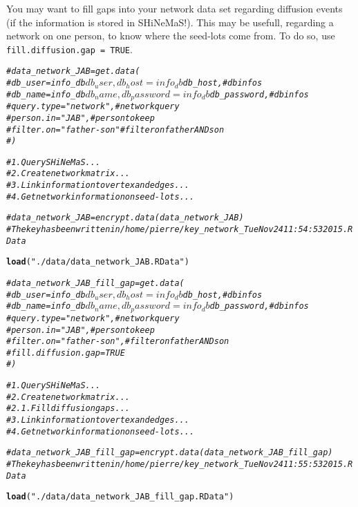 \documentclass{article}\usepackage[]{graphicx}\usepackage[]{color}
\makeatletter
\newcommand{\hlstr}[1]{\textcolor[rgb]{0.192,0.494,0.8}{#1}}%
\newcommand{\hlcom}[1]{\textcolor[rgb]{0.678,0.584,0.686}{\textit{#1}}}%
\newcommand{\hlstd}[1]{\textcolor[rgb]{0.345,0.345,0.345}{#1}}%
\newcommand{\hlkwd}[1]{\textcolor[rgb]{0.737,0.353,0.396}{\textbf{#1}}}%
\newenvironment{kframe}{%
 \def\at@end@of@kframe{}%
 \ifinner\ifhmode%
  \def\at@end@of@kframe{\end{minipage}}%
  \begin{minipage}{\columnwidth}%
 \fi\fi%
 \def\FrameCommand##1{\hskip\@totalleftmargin \hskip-\fboxsep
 \colorbox{shadecolor}{##1}\hskip-\fboxsep
     \hskip-\linewidth \hskip-\@totalleftmargin \hskip\columnwidth}%
 \MakeFramed {\advance\hsize-\width
   \@totalleftmargin\z@ \linewidth\hsize
   \@setminipage}}%
 {\par\unskip\endMakeFramed%
 \at@end@of@kframe}
\newenvironment{knitrout}{}{} %
\newcommand{\BD}{SHiNeMaS}
\makeatother
\begin{document}
You may want to fill gaps into your network data set regarding diffusion events (if the information is stored in \BD!).
This may be usefull, regarding a network on one person, to know where the seed-lots come from.
To do so, use \texttt{fill.diffusion.gap = TRUE}.

\begin{knitrout}
\color{fgcolor}\begin{kframe}
\begin{alltt}
\hlcom{#data_network_JAB = get.data(}
\hlcom{#	db_user = info_db$db_user, db_host = info_db$db_host, # db infos}
\hlcom{#	db_name = info_db$db_name, db_password = info_db$db_password,  # db infos}
\hlcom{#	query.type = "network", # network query}
\hlcom{#	person.in = "JAB", # person to keep}
\hlcom{#	filter.on = "father-son" # filter on father AND son}
\hlcom{#	)}

\hlcom{# 1. Query SHiNeMaS ...}
\hlcom{# 2. Create network matrix ...}
\hlcom{# 3. Link information to vertex and edges ...}
\hlcom{# 4. Get network information on seed-lots ...}

\hlcom{#data_network_JAB = encrypt.data(data_network_JAB)}
\hlcom{# The key has been written in /home/pierre/key_network_Tue Nov 24 11:54:53 2015.RData}

\hlkwd{load}\hlstd{(}\hlstr{"./data/data_network_JAB.RData"}\hlstd{)}
\end{alltt}
\end{kframe}
\end{knitrout}

\begin{knitrout}
\color{fgcolor}\begin{kframe}
\begin{alltt}
\hlcom{#data_network_JAB_fill_gap = get.data(}
\hlcom{#	db_user = info_db$db_user, db_host = info_db$db_host, # db infos}
\hlcom{#	db_name = info_db$db_name, db_password = info_db$db_password, # db infos}
\hlcom{#	query.type = "network", # network query}
\hlcom{#	person.in = "JAB", # person to keep}
\hlcom{#	filter.on = "father-son", # filter on father AND son}
\hlcom{#	fill.diffusion.gap = TRUE}
\hlcom{#	)}

\hlcom{# 1. Query SHiNeMaS ...}
\hlcom{# 2. Create network matrix ...}
\hlcom{# 2.1. Fill diffusion gaps ...}
\hlcom{# 3. Link information to vertex and edges ...}
\hlcom{# 4. Get network information on seed-lots ...}

\hlcom{#data_network_JAB_fill_gap = encrypt.data(data_network_JAB_fill_gap)}
\hlcom{# The key has been written in /home/pierre/key_network_Tue Nov 24 11:55:53 2015.RData}

\hlkwd{load}\hlstd{(}\hlstr{"./data/data_network_JAB_fill_gap.RData"}\hlstd{)}
\end{alltt}
\end{kframe}
\end{knitrout}
\end{document}
